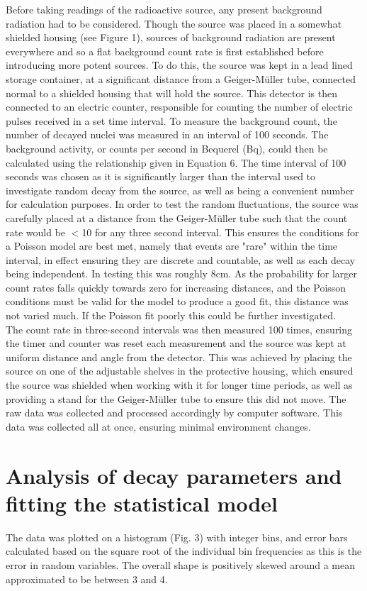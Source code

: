 \documentclass[11pt]{article}
\begin{document}
    Before taking readings of the radioactive source, any present background radiation had to be considered. Though the source was placed in a somewhat shielded housing (see Figure 1), sources of background radiation are present everywhere and so a flat background count rate is first established before introducing more potent sources. To do this, the source was kept in a lead lined storage container, at a significant distance from a Geiger-Müller tube, connected normal to a shielded housing that will hold the source. This detector is then connected to an electric counter, responsible for counting the number of electric pulses received in a set time interval. To measure the background count, the number of decayed nuclei was measured in an interval of 100 seconds. The background activity, or counts per second in Bequerel (Bq), could then be calculated using the relationship given in Equation 6. The time interval of 100 seconds was chosen as it is significantly larger than the interval used to investigate random decay from the source, as well as being a convenient number for calculation purposes.  \newline
    In order to test the random fluctuations, the  source was carefully placed at a distance from the Geiger-Müller tube such that the count rate would be $<$10 for any three second interval. This ensures the conditions for a Poisson model are best met, namely that events are "rare" within the time interval, in effect ensuring they are discrete and countable, as well as each decay being independent. In testing this was roughly 8cm. As the probability for larger count rates falls quickly towards zero for increasing distances, and the Poisson conditions must be valid for the model to produce a good fit, this distance was not varied much. If the Poisson fit poorly this could be further investigated.  \\
    The count rate in three-second intervals was then measured 100 times, ensuring the timer and counter was reset each measurement and the source was kept at uniform distance and angle from the detector. This was achieved by placing the source on one of the adjustable shelves in the protective housing, which ensured the source was shielded when working with it for longer time periods, as well as providing a stand for the Geiger-Müller tube to ensure this did not move. The raw data was collected and processed accordingly by computer software. This data was collected all at once, ensuring minimal environment changes.
\section{Analysis of decay parameters and fitting the statistical model}
The data was plotted on a histogram (Fig. 3) with integer bins, and error bars calculated based on the square root of the individual bin frequencies as this is the error in random variables.  The overall shape is positively skewed around a mean approximated to be between 3 and 4.\\
\end{document}
